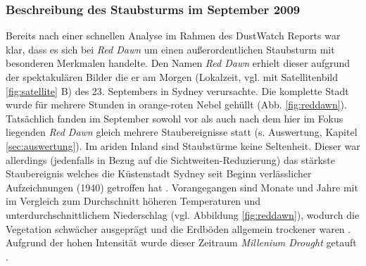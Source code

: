 \documentclass[12pt,a4paper,onecolumn]{scrartcl}
\begin{document}
\subsubsection{Beschreibung des Staubsturms im September 2009} \label{sec:reddawn}
Bereits nach einer schnellen Analyse im Rahmen des DustWatch Reports \citep{Leys.2009} war klar, dass es sich bei \textit{Red Dawn} um einen außerordentlichen Staubsturm mit besonderen Merkmalen handelte. Den Namen \textit{Red Dawn} erhielt dieser aufgrund der spektakulären Bilder die er am Morgen (Lokalzeit, vgl. mit Satellitenbild \ref{fig:satellite} B) des 23. Septembers in Sydney verursachte. Die komplette Stadt wurde für mehrere Stunden in orange-roten Nebel gehüllt (Abb. \ref{fig:reddawn}). Tatsächlich fanden im September sowohl vor als auch nach dem hier im Fokus liegenden \textit{Red Dawn} gleich mehrere Staubereignisse statt (s. Auswertung, Kapitel \ref{sec:auswertung}). Im ariden Inland sind Staubstürme keine Seltenheit. Dieser war allerdings (jedenfalls in Bezug auf die Sichtweiten-Reduzierung) das stärkste Staubereignis welches die Küstenstadt Sydney seit Beginn verlässlicher Aufzeichnungen (1940) getroffen hat \citep{Leys.2011}. Vorangegangen sind Monate und Jahre mit im Vergleich zum Durchschnitt höheren Temperaturen und unterdurchschnittlichem Niederschlag (vgl. Abbildung \ref{fig:reddawn}), wodurch die Vegetation schwächer ausgeprägt und die Erdböden allgemein trockener waren \citep{Leys.2011}. Aufgrund der hohen Intensität wurde dieser Zeitraum \textit{Millenium Drought} getauft \citep{Deckker.2014}.
\end{document}
